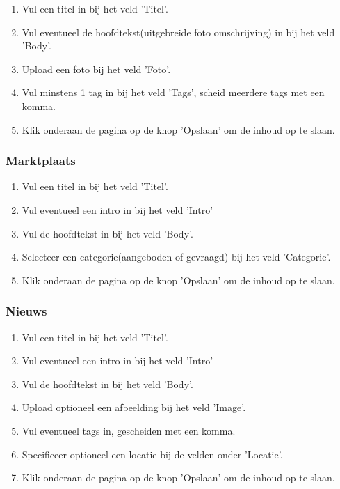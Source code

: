 \begin{enumerate}
\item Vul een titel in bij het veld 'Titel'.
\item Vul eventueel de hoofdtekst(uitgebreide foto omschrijving) in bij het veld 'Body'.
\item Upload een foto bij het veld 'Foto'.
\item Vul minstens 1 tag in bij het veld 'Tags', scheid meerdere tags met een komma.
\item Klik onderaan de pagina op de knop 'Opslaan' om de inhoud op te slaan.
\end{enumerate}

\subsubsection{Marktplaats}\label{marktplaats}

\begin{enumerate}
\item Vul een titel in bij het veld 'Titel'.
\item Vul eventueel een intro in bij het veld 'Intro'
\item Vul de hoofdtekst in bij het veld 'Body'.
\item Selecteer een categorie(aangeboden of gevraagd) bij het veld 'Categorie'.
\item Klik onderaan de pagina op de knop 'Opslaan' om de inhoud op te slaan.
\end{enumerate}

\subsubsection{Nieuws}\label{nieuws}

\begin{enumerate}
\item Vul een titel in bij het veld 'Titel'.
\item Vul eventueel een intro in bij het veld 'Intro'
\item Vul de hoofdtekst in bij het veld 'Body'.
\item Upload optioneel een afbeelding bij het veld 'Image'.
\item Vul eventueel tags in, gescheiden met een komma.
\item Specificeer optioneel een locatie bij de velden onder 'Locatie'.
\item Klik onderaan de pagina op de knop 'Opslaan' om de inhoud op te slaan.
\end{enumerate}

